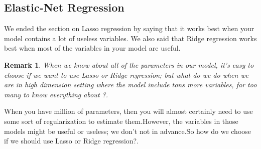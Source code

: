 \documentclass[12pt]{report}
\newtheorem{remarque}{Remark}[section]
\begin{document}
	\subsection{Elastic-Net Regression}
	We ended the section on Lasso regression by saying that it works best when your model contains a lot of useless variables. We also said that Ridge regression works best when most of the variables in your model are useful.
	
	\begin{remarque}
		When we know about all of the parameters in our model, it's easy to choose if we want to use Lasso or Ridge regression; but what do we do when we are in high dimension setting where the model include tons more variables, far too many to know everything about ?.
	\end{remarque}
	
	When you have million of parameters, then you will almost certainly need to use some sort of regularization to estimate them.However, the variables in those models might be useful or useless; we don't not in advance.So how do we choose if we should use Lasso or Ridge regression?.
	
\end{document}
